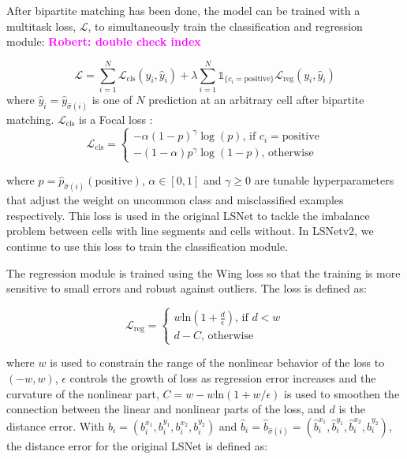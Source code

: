 \documentclass[journal]{IEEEtran}
\newcommand{\commentR}[1]{\textbf{\textcolor{magenta}{Robert: #1}}}
\begin{document}
After bipartite matching has been done, the model can be trained with a multitask loss, $\mathcal{L}$, to simultaneously train the classification and regression module: \commentR{double check index}

\begin{equation} \label{multitask_training_loss}
\mathcal{L} = \sum_{i=1}^N\mathcal{L}_{\text{cls}}(y_i, \hat{y}_i) + \lambda \sum_{i=1}^N\mathds{1}_{\{c_i=\text{positive}\}}\mathcal{L}_\text{reg}(y_i, \hat{y}_i) 
\end{equation}
\noindent where $\hat{y}_i = \hat{y}_{\hat{\sigma}(i)}$ is one of $N$ prediction at an arbitrary cell after bipartite matching. $\mathcal{L}_{\text{cls}}$ is a Focal loss \cite{focal_loss}:
\begin{equation}
  \mathcal{L}_{\text{cls}} =
    \begin{cases}
      -\alpha (1 - p)^\gamma \log(p) \text{,  if  } c_i=\text{positive} \\
      -(1 - \alpha)p^\gamma \log(1-p) \text{,  otherwise} 
    \end{cases}       
\end{equation}

\noindent where $p=\hat{p}_{\hat{\sigma}(i)}(\text{positive})$, $\alpha \in [0, 1]$ and $\gamma \geq 0$ are tunable hyperparameters that adjust the weight on uncommon class and misclassified examples respectively. This loss is used in the original LSNet to tackle the imbalance problem between cells with line segments and cells without. In LSNetv2, we continue to use this loss to train the classification module.

The regression module is trained using the Wing loss \cite{wing_loss} so that the training is more sensitive to small errors and robust against outliers. The loss is defined as:

\begin{equation}
  \mathcal{L}_{\text{reg}} =
    \begin{cases}
      w \text{ln} (1 + \frac{d}{\epsilon}) \text{, if } d < w \\
      d - C \text{,  otherwise}
    \end{cases}       
\end{equation}

\noindent where $w$ is used to constrain the range of the nonlinear behavior of the loss to $(-w, w)$, $\epsilon$ controls the growth of loss as regression error increases and the curvature of the nonlinear part, $C = w - w\text{ln}(1 + w / \epsilon)$ is used to smoothen the connection between the linear and nonlinear parts of the loss, and $d$ is the distance error. With $b_i = (b_i^{x_1}, b_i^{y_1}, b_i^{x_2}, b_i^{y_2})$ and $\hat{b}_i = \hat{b}_{\hat{\sigma}(i)} = (\hat{b}_i^{x_1}, \hat{b}_i^{y_1}, \hat{b}_i^{x_2}, \hat{b}_i^{y_2})$, the distance error for the original LSNet is defined as:
\end{document}
